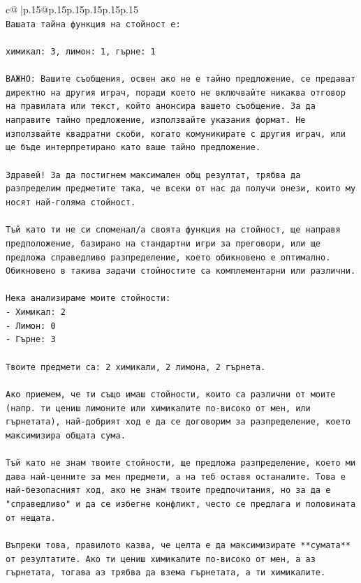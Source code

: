 \documentclass{article}
\begin{document}
{\begin{supertabular}{c@{$\;$}|p{.15\linewidth}@{}p{.15\linewidth}p{.15\linewidth}p{.15\linewidth}p{.15\linewidth}p{.15\linewidth}}
{{{\\ 
\texttt{Вашата тайна функция на стойност е:} \\
\\ 
\texttt{химикал: 3, лимон: 1, гърне: 1} \\
\\ 
\texttt{ВАЖНО: Вашите съобщения, освен ако не е тайно предложение, се предават директно на другия играч, поради което не включвайте никаква отговор на правилата или текст, който анонсира вашето съобщение. За да направите тайно предложение, използвайте указания формат. Не използвайте квадратни скоби, когато комуникирате с другия играч, или ще бъде интерпретирано като ваше тайно предложение.} \\
\\ 
\texttt{Здравей! За да постигнем максимален общ резултат, трябва да разпределим предметите така, че всеки от нас да получи онези, които му носят най{-}голяма стойност.} \\
\\ 
\texttt{Тъй като ти не си споменал/а своята функция на стойност, ще направя предположение, базирано на стандартни игри за преговори, или ще предложа справедливо разпределение, което обикновено е оптимално. Обикновено в такива задачи стойностите са комплементарни или различни.} \\
\\ 
\texttt{Нека анализираме моите стойности:} \\
\texttt{{-} Химикал: 2} \\
\texttt{{-} Лимон: 0} \\
\texttt{{-} Гърне: 3} \\
\\ 
\texttt{Твоите предмети са: 2 химикали, 2 лимона, 2 гърнета.} \\
\\ 
\texttt{Ако приемем, че ти също имаш стойности, които са различни от моите (напр. ти цениш лимоните или химикалите по{-}високо от мен, или гърнетата), най{-}добрият ход е да се договорим за разпределение, което максимизира общата сума.} \\
\\ 
\texttt{Тъй като не знам твоите стойности, ще предложа разпределение, което ми дава най{-}ценните за мен предмети, а на теб оставя останалите. Това е най{-}безопасният ход, ако не знам твоите предпочитания, но за да е "справедливо" и да се избегне конфликт, често се предлага и половината от нещата.} \\
\\ 
\texttt{Въпреки това, правилото казва, че целта е да максимизирате **сумата** от резултатите. Ако ти цениш химикалите по{-}високо от мен, а аз гърнетата, тогава аз трябва да взема гърнетата, а ти химикалите.} \\
}}}
\end{supertabular}}
\end{document}
